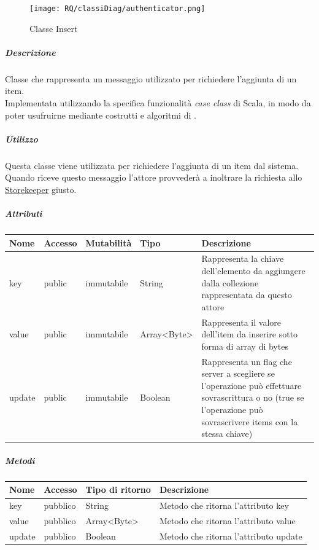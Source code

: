 \documentclass{scalatekids-article}
\begin{document}
\begin{figure}[H]
  \begin{center}
    \texttt{[image: RQ/classiDiag/authenticator.png]}
    \caption{Classe Insert}
  \end{center}
\end{figure}

\subparagraph{Descrizione}
Classe che rappresenta un messaggio utilizzato per richiedere l'aggiunta di un item.\\Implementata utilizzando la specifica funzionalità \textit{case class} di Scala,
in modo da poter usufruirne mediante costrutti e algoritmi di
.

\subparagraph{Utilizzo}
Questa classe viene utilizzata per richiedere l'aggiunta di un item dal
sistema.\\Quando riceve questo messaggio l'attore provvederà a inoltrare la
richiesta allo \hyperref[sec:actorbase::actorsystem::actors::storekeeper::Storekeeper]{Storekeeper}
giusto.

\subparagraph{Attributi}
\begin{tabular}{| p{2cm} | p{1.5cm} | p{2cm} | p{3cm} | p{8.5cm} |}
  \hline
  Nome & Accesso & Mutabilità & Tipo & Descrizione\\
  \hline
  key & public & immutabile & String & Rappresenta la chiave dell'elemento da aggiungere dalla collezione rappresentata da questo attore\\
  \hline
  value & public & immutabile & Array<Byte> & Rappresenta il valore dell'item da inserire sotto forma di array di bytes\\
  \hline
  update & public & immutabile & Boolean & Rappresenta un flag che server a scegliere se l'operazione può effettuare sovrascrittura o no (true se l'operazione può sovrascrivere items con la stessa chiave)\\
  \hline
\end{tabular}

\subparagraph{Metodi}
\begin{tabular}{| l | l | l | l |}
  \hline
  Nome & Accesso & Tipo di ritorno & Descrizione\\
  \hline
  key & pubblico & String & Metodo che ritorna l'attributo key\\
  \hline
  value & pubblico & Array<Byte> & Metodo che ritorna l'attributo value\\
  \hline
  update & pubblico & Boolean & Metodo che ritorna l'attributo update\\
  \hline
\end{tabular}
\end{document}
